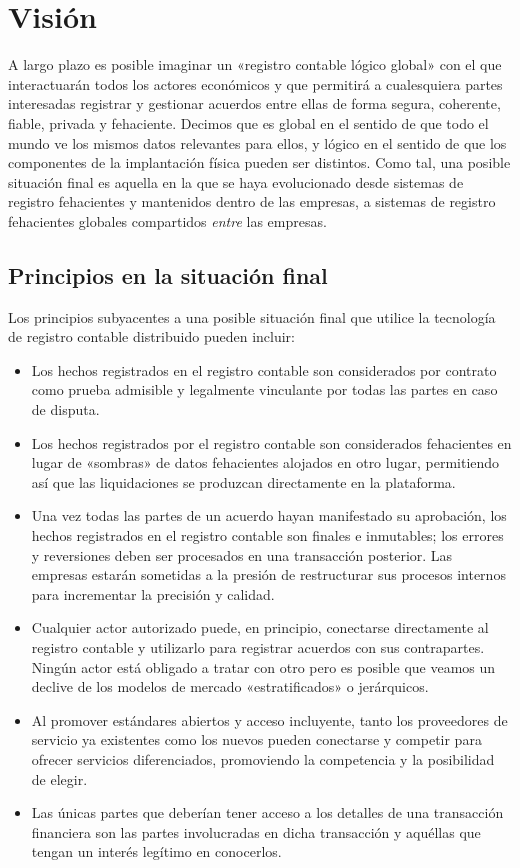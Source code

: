 \documentclass{article}
\begin{document}
\section{Visión}
A largo plazo es posible imaginar un «registro contable lógico global» con el que interactuarán todos los actores económicos y que permitirá a cualesquiera partes interesadas registrar y gestionar acuerdos entre ellas de forma segura, coherente, fiable, privada y fehaciente. Decimos que es global en el sentido de que todo el mundo ve los mismos datos relevantes para ellos, y lógico en el sentido de que los componentes de la implantación física pueden ser distintos. Como tal, una posible situación final es aquella en la que se haya evolucionado desde sistemas de registro fehacientes y mantenidos dentro de las empresas, a sistemas de registro fehacientes globales compartidos \textit{entre} las empresas. 

\subsection{Principios en la situación final}
Los principios subyacentes a una posible situación final que utilice la tecnología de registro contable distribuido pueden incluir:
\begin{itemize}
	\item Los hechos registrados en el registro contable son considerados por contrato como prueba admisible y legalmente vinculante por todas las partes en caso de disputa.
	\item Los hechos registrados por el registro contable son considerados fehacientes en lugar de «sombras» de datos fehacientes alojados en otro lugar, permitiendo así que las liquidaciones se produzcan directamente en la plataforma.
	\item Una vez todas las partes de un acuerdo hayan manifestado su aprobación, los hechos registrados en el registro contable son finales e inmutables; los errores y reversiones deben ser procesados en una transacción posterior. Las empresas estarán sometidas a la presión de restructurar sus procesos internos para incrementar la precisión y calidad.
	\item Cualquier actor autorizado puede, en principio, conectarse directamente al registro contable y utilizarlo para registrar acuerdos con sus contrapartes. Ningún actor está obligado a tratar con otro pero es posible que veamos un declive de los modelos de mercado «estratificados» o jerárquicos. 
	\item Al promover estándares abiertos y acceso incluyente, tanto los proveedores de servicio ya existentes como los nuevos pueden conectarse y competir para ofrecer servicios diferenciados, promoviendo la competencia y la posibilidad de elegir.
	\item Las únicas partes que deberían tener acceso a los detalles de una transacción financiera son las partes involucradas en dicha transacción y aquéllas que tengan un interés legítimo en conocerlos.
\end{itemize}
\end{document}
